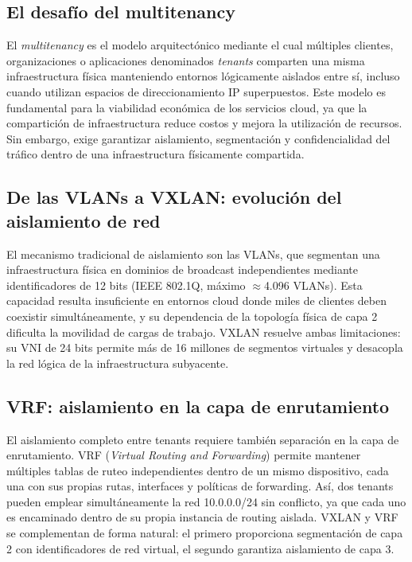 
\subsection{El desafío del multitenancy}

El \textit{multitenancy} es el modelo arquitectónico mediante el cual múltiples clientes, organizaciones o aplicaciones denominados \textit{tenants} comparten una misma infraestructura física manteniendo entornos lógicamente aislados entre sí, incluso cuando utilizan espacios de direccionamiento IP superpuestos. Este modelo es fundamental para la viabilidad económica de los servicios cloud, ya que la compartición de infraestructura reduce costos y mejora la utilización de recursos. Sin embargo, exige garantizar aislamiento, segmentación y confidencialidad del tráfico dentro de una infraestructura físicamente compartida.

\subsection{De las VLANs a VXLAN: evolución del aislamiento de red}

El mecanismo tradicional de aislamiento son las VLANs, que segmentan una infraestructura física en dominios de broadcast independientes mediante identificadores de 12 bits (IEEE 802.1Q, máximo $\approx$4.096 VLANs). Esta capacidad resulta insuficiente en entornos cloud donde miles de clientes deben coexistir simultáneamente, y su dependencia de la topología física de capa 2 dificulta la movilidad de cargas de trabajo. VXLAN resuelve ambas limitaciones: su VNI de 24 bits permite más de 16 millones de segmentos virtuales y desacopla la red lógica de la infraestructura subyacente.

\subsection{VRF: aislamiento en la capa de enrutamiento}

El aislamiento completo entre tenants requiere también separación en la capa de enrutamiento. VRF (\textit{Virtual Routing and Forwarding}) permite mantener múltiples tablas de ruteo independientes dentro de un mismo dispositivo, cada una con sus propias rutas, interfaces y políticas de forwarding. Así, dos tenants pueden emplear simultáneamente la red 10.0.0.0/24 sin conflicto, ya que cada uno es encaminado dentro de su propia instancia de routing aislada. VXLAN y VRF se complementan de forma natural: el primero proporciona segmentación de capa 2 con identificadores de red virtual, el segundo garantiza aislamiento de capa 3.


